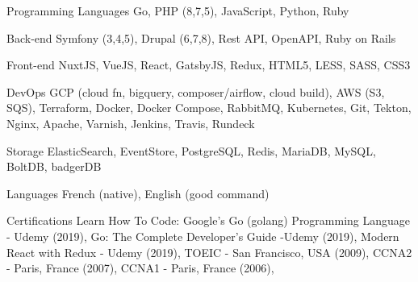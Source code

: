 

\begin{cvskills}

  \cvskill
    {Programming Languages} %
    {Go, PHP (8,7,5), JavaScript, Python, Ruby} %

  \cvskill
    {Back-end} %
    {Symfony (3,4,5), Drupal (6,7,8), Rest API, OpenAPI, Ruby on Rails} %

  \cvskill
    {Front-end} %
    {NuxtJS, VueJS, React, GatsbyJS, Redux, HTML5, LESS, SASS, CSS3} %

  \cvskill
    {DevOps} %
    {GCP (cloud fn, bigquery, composer/airflow, cloud build), AWS (S3, SQS), Terraform, Docker, Docker Compose, RabbitMQ, Kubernetes, Git, Tekton, Nginx, Apache, Varnish, Jenkins, Travis, Rundeck} %

  \cvskill
    {Storage} %
    {ElasticSearch, EventStore, PostgreSQL, Redis, MariaDB, MySQL, BoltDB, badgerDB} %

  \cvskill
    {Languages} %
    {French (native), English (good command)} %

  \cvskill
  {Certifications} %
  {
  Learn How To Code: Google’s Go (golang) Programming Language - Udemy (2019),
  Go: The Complete Developer’s Guide -Udemy (2019),
  Modern React with Redux - Udemy (2019),
  TOEIC - San Francisco, USA (2009),
  CCNA2 - Paris, France (2007),
  CCNA1 - Paris, France (2006),
  } %

\end{cvskills}
